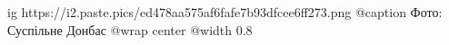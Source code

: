  
 
 
 
 

\ifcmt
  ig https://i2.paste.pics/ed478aa575af6fafe7b93dfcee6ff273.png
	@caption Фото: Суспільне Донбас
  @wrap center
  @width 0.8
\fi
